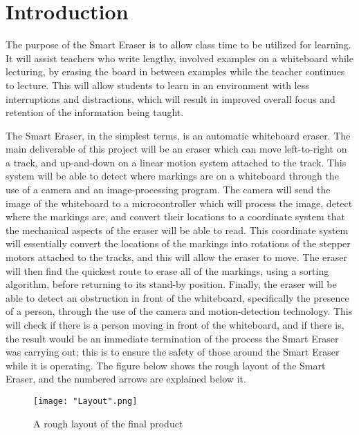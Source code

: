  \section{Introduction}
 The purpose of the Smart Eraser is to allow class time to be utilized for learning. It will assist teachers who write lengthy, involved examples on a whiteboard while lecturing, by erasing the board in between examples while the teacher continues to lecture. This will allow students to learn in an environment with less interruptions and distractions, which will result in improved overall focus and retention of the information being taught. \par
\setlength{\parindent}{2.5ex} The Smart Eraser, in the simplest terms, is an automatic whiteboard eraser. The main deliverable of this project will be an eraser which can move left-to-right on a track, and up-and-down on a linear motion system attached to the track. This system will be able to detect where markings are on a whiteboard through the use of a camera and an image-processing program. The camera will send the image of the whiteboard to a microcontroller which will process the image, detect where the markings are, and convert their locations to a coordinate system that the mechanical aspects of the eraser will be able to read. This coordinate system will essentially convert the locations of the markings into rotations of the stepper motors attached to the tracks, and this will allow the eraser to move. The eraser will then find the quickest route to erase all of the markings, using a sorting algorithm, before returning to its stand-by position. Finally, the eraser will be able to detect an obstruction in front of the whiteboard, specifically the presence of a person, through the use of the camera and motion-detection technology. This will check if there is a person moving in front of the whiteboard, and if there is, the result would be an immediate termination of the process the Smart Eraser was carrying out; this is to ensure the safety of those around the Smart Eraser while it is operating. The figure below shows the rough layout of the Smart Eraser, and the numbered arrows are explained below it.

\begin{figure}[h!]
	\centering
	\texttt{[image: "Layout".png]}
	\caption{A rough layout of the final product}
	\label{fig:GANTT186A}
\end{figure}

